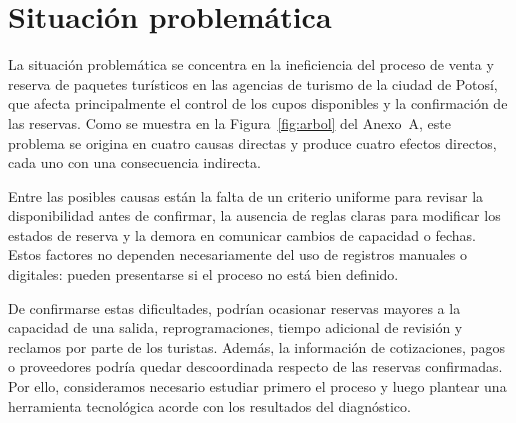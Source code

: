 \chapter{Situación problemática}
\label{cap:situacion}

La situación problemática se concentra en la ineficiencia del proceso de
venta y reserva de paquetes turísticos en las agencias de turismo de la
ciudad de Potosí, que afecta principalmente el control de los cupos
disponibles y la confirmación de las reservas. Como se muestra en la
Figura~\ref{fig:arbol} del Anexo~A, este problema se origina en cuatro
causas directas y produce cuatro efectos directos, cada uno con una
consecuencia indirecta.

Entre las posibles causas están la falta de un criterio uniforme para
revisar la disponibilidad antes de confirmar, la ausencia de reglas claras
para modificar los estados de reserva y la demora en comunicar cambios de
capacidad o fechas. Estos factores no dependen necesariamente del uso de
registros manuales o digitales: pueden presentarse si el proceso no está
bien definido.

De confirmarse estas dificultades, podrían ocasionar reservas mayores a la
capacidad de una salida, reprogramaciones, tiempo adicional de revisión y
reclamos por parte de los turistas. Además, la información de cotizaciones,
pagos o proveedores podría quedar descoordinada respecto de las reservas
confirmadas. Por ello, consideramos necesario estudiar primero el proceso y
luego plantear una herramienta tecnológica acorde con los resultados del
diagnóstico.
